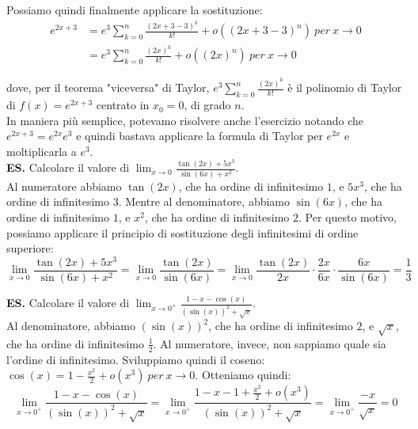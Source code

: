 \documentclass{article}
\begin{document}
\noindent Possiamo quindi finalmente applicare la sostituzione:
\begin{align*}
    e^{2x + 3} &= e^3 \sum_{k = 0}^n \frac{(2x + 3 - 3)^k}{k!} + o((2x + 3 - 3)^n) \ per \ x \to 0\\
    &= e^3 \sum_{k = 0}^n \frac{(2x)^k}{k!} + o ((2x)^n) \ per \ x \to 0
\end{align*}

\noindent dove, per il teorema "viceversa" di Taylor, $e^3\sum_{k = 0}^n \frac{(2x)^k}{k!}$ è il polinomio di Taylor di $f(x) = e^{2x + 3}$ centrato in $x_0 = 0$, di grado $n$.\\

\noindent In maniera più semplice, potevamo risolvere anche l'esercizio notando che $e^{2x + 3} = e^{2x} e^3$ e quindi bastava applicare la formula di Taylor per $e^{2x}$ e moltiplicarla a $e^3$.\\

\noindent\textbf{ES.} Calcolare il valore di $\lim_{x \to 0} \frac{\tan(2x) + 5x^3}{\sin(6x) + x^2}$.\\
Al numeratore abbiamo $\tan(2x)$, che ha ordine di infinitesimo $1$, e $5x^3$, che ha ordine di infinitesimo $3$. Mentre al denominatore, abbiamo $\sin(6x)$, che ha ordine di infinitesimo $1$, e $x^2$, che ha ordine di infinitesimo $2$. Per questo motivo, possiamo applicare il principio di sostituzione degli infinitesimi di ordine superiore:
\begin{equation*}
    \lim_{x \to 0} \frac{\tan(2x) + 5x^3}{\sin(6x) + x^2} = \lim_{x \to 0} \frac{\tan(2x)}{\sin(6x)} = \lim_{x \to 0} \frac{\tan(2x)}{2x} \cdot \frac{2x}{6x} \cdot \frac{6x}{\sin(6x)} = \frac{1}{3}
\end{equation*}

\noindent\textbf{ES.} Calcolare il valore di $\lim_{x \to 0^+} \frac{1 - x - \cos(x)}{(\sin(x))^2 + \sqrt{x}}$.\\
Al denominatore, abbiamo $(\sin(x))^2$, che ha ordine di infinitesimo $2$, e $\sqrt{x}$, che ha ordine di infinitesimo $\frac{1}{2}$. Al numeratore, invece, non sappiamo quale sia l'ordine di infinitesimo. Sviluppiamo quindi il coseno: $\cos(x) = 1 - \frac{x^2}{2} + o(x^3) \ per \ x \to 0$. Otteniamo quindi:
\begin{equation*}
    \lim_{x \to 0^+} \frac{1 - x - \cos(x)}{(\sin(x))^2 + \sqrt{x}} = \lim_{x \to 0^+} \frac{1 - x - 1 + \frac{x^2}{2} + o(x^3)}{(\sin(x))^2 + \sqrt{x}} = \lim_{x \to 0^+} \frac{-x}{\sqrt{x}} = 0
\end{equation*}
\end{document}
